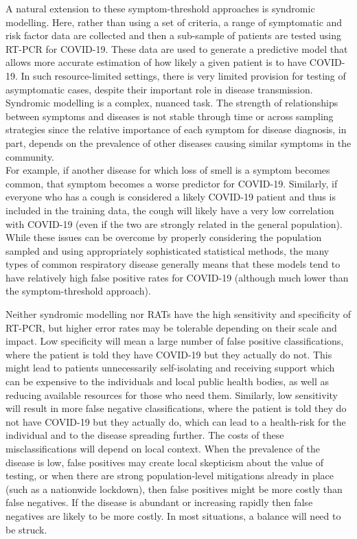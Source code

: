 \documentclass[]{elsarticle} %
\begin{document}
A natural extension to these symptom-threshold approaches is syndromic
modelling. Here, rather than using a set of criteria, a range of
symptomatic and risk factor data are collected and then a sub-sample of
patients are tested using RT-PCR for COVID-19. These data are used to
generate a predictive model that allows more accurate estimation of how
likely a given patient is to have COVID-19. In such resource-limited
settings, there is very limited provision for testing of asymptomatic
cases, despite their important role in disease transmission. Syndromic
modelling is a complex, nuanced task. The strength of relationships
between symptoms and diseases is not stable through time or across
sampling strategies since the relative importance of each symptom for
disease diagnosis, in part, depends on the prevalence of other diseases
causing similar symptoms in the community.\\
For example, if another disease for which loss of smell is a symptom
becomes common, that symptom becomes a worse predictor for COVID-19.
Similarly, if everyone who has a cough is considered a likely COVID-19
patient and thus is included in the training data, the cough will likely
have a very low correlation with COVID-19 (even if the two are strongly
related in the general population). While these issues can be overcome
by properly considering the population sampled and using appropriately
sophisticated statistical methods, the many types of common respiratory
disease generally means that these models tend to have relatively high
false positive rates for COVID-19 (although much lower than the
symptom-threshold approach).

Neither syndromic modelling nor RATs have the high sensitivity and
specificity of RT-PCR, but higher error rates may be tolerable depending
on their scale and impact. Low specificity will mean a large number of
false positive classifications, where the patient is told they have
COVID-19 but they actually do not. This might lead to patients
unnecessarily self-isolating and receiving support which can be
expensive to the individuals and local public health bodies, as well as
reducing available resources for those who need them. Similarly, low
sensitivity will result in more false negative classifications, where
the patient is told they do not have COVID-19 but they actually do,
which can lead to a health-risk for the individual and to the disease
spreading further. The costs of these misclassifications will depend on
local context. When the prevalence of the disease is low, false
positives may create local skepticism about the value of testing, or
when there are strong population-level mitigations already in place
(such as a nationwide lockdown), then false positives might be more
costly than false negatives. If the disease is abundant or increasing
rapidly then false negatives are likely to be more costly. In most
situations, a balance will need to be struck.
\end{document}
